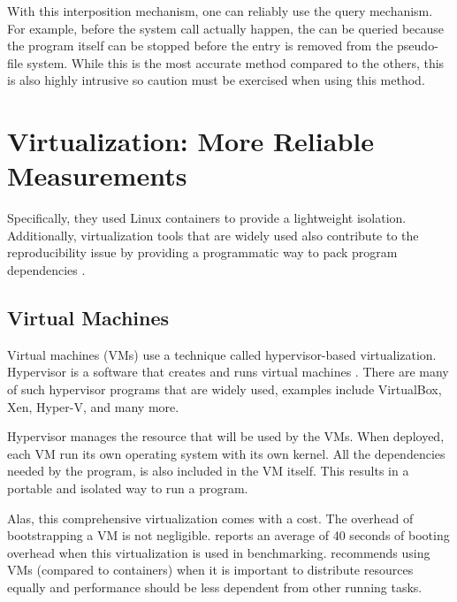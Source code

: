 With this interposition mechanism, one can reliably use the query mechanism.
For example, before the  system call actually happen, the  can be queried because the program itself can be stopped before the entry is removed from the pseudo-file system.
While this is the most accurate method compared to the others, this is also highly intrusive so caution must be exercised when using this method.

\section{Virtualization: More Reliable Measurements}
\label{sec:resource.virtualization}

Specifically, they used Linux containers to provide a lightweight isolation.
Additionally, virtualization tools that are widely used also contribute to the reproducibility issue by providing a programmatic way to pack program dependencies \citep{boettigerIntroductionDockerReproducible2015,kordonBenchKitToolMassive2014}.

\subsection{Virtual Machines}

Virtual machines (VMs) use a technique called hypervisor-based virtualization.
Hypervisor is a software that creates and runs virtual machines \citep{scheepersVirtualizationContainerizationApplication2014}.
There are many of such hypervisor programs that are widely used, examples include VirtualBox, Xen, Hyper-V, and many more.

Hypervisor manages the resource that will be used by the VMs.
When deployed, each VM run its own operating system with its own kernel.
All the dependencies needed by the program, is also included in the VM itself.
This results in a portable and isolated way to run a program.

Alas, this comprehensive virtualization comes with a cost.
The overhead of bootstrapping a VM is not negligible.
\citet{kordonBenchKitToolMassive2014} reports an average of 40 seconds of booting overhead when this virtualization is used in benchmarking.
\citet{scheepersVirtualizationContainerizationApplication2014} recommends using VMs (compared to containers) when it is important to distribute resources equally and performance should be less dependent from other running tasks.

